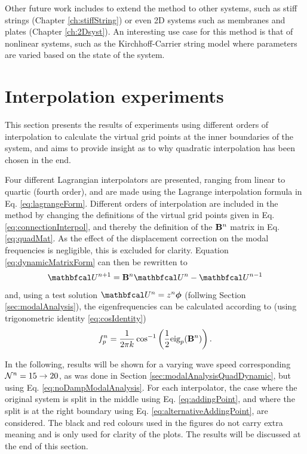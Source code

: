 Other future work includes to extend the method to other systems, such as stiff strings (Chapter \ref{ch:stiffString}) or even 2D systems such as membranes and plates (Chapter \ref{ch:2Dsyst}). An interesting use case for this method is that of nonlinear systems, such as the Kirchhoff-Carrier string model \cite{Carrier1945} where parameters are varied based on the state of the system. 

\section{Interpolation experiments}\label{sec:iterations}
This section presents the results of experiments using different orders of interpolation to calculate the virtual grid points at the inner boundaries of the system, and aims to provide insight as to why quadratic interpolation has been chosen in the end. 

Four different Lagrangian interpolators are presented, ranging from linear to quartic (fourth order), and are made using the Lagrange interpolation formula in Eq. \eqref{eq:lagrangeForm}. Different orders of interpolation are included in the method by changing the definitions of the virtual grid points given in Eq. \eqref{eq:connectionInterpol}, and thereby the definition of the $\mathbf{B}^n$ matrix in Eq. \eqref{eq:quadMat}. As the effect of the displacement correction on the modal frequencies is negligible, this is excluded for clarity. Equation \eqref{eq:dynamicMatrixForm} can then be rewritten to 
\begin{equation}
    \Ucal^{n+1} = \B^n \Ucal^n- \Ucal^{n-1}
\end{equation}
and, using a test solution $\Ucal^n = z^n\boldPhi$ (follwing Section \ref{sec:modalAnalysis}), the eigenfrequencies can be calculated according to (using trigonometric identity \eqref{eq:cosIdentity})
\begin{equation}\label{eq:noDampModalAnalysis}
    f_p^n = \frac{1}{2 \pi k}\cos^{-1}\left(\frac{1}{2}\text{eig}_p(\mathbf{B}^n)\right).
\end{equation}

In the following, results will be shown for a varying wave speed corresponding $\mathcal{N}^n = 15 \rightarrow 20$, as was done in Section \ref{sec:modalAnalysisQuadDynamic}, but using Eq. \eqref{eq:noDampModalAnalysis}. For each interpolator, the case where the original system is split in the middle using Eq. \eqref{eq:addingPoint}, and where the split is at the right boundary using Eq. \eqref{eq:alternativeAddingPoint}, are considered. The black and red colours used in the figures do not carry extra meaning and is only used for clarity of the plots. The results will be discussed at the end of this section. 
 
